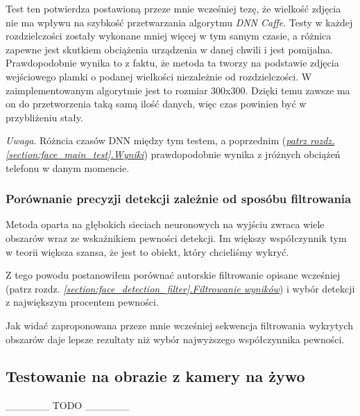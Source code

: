 

Test ten potwierdza postawioną przeze mnie wcześniej tezę, że wielkość zdjęcia nie ma wpływu na szybkość przetwarzania algorytmu \textit{DNN Caffe}. Testy w każdej rozdzielczości zostały wykonane mniej więcej w tym samym czasie, a różnica zapewne jest skutkiem obciążenia urządzenia w danej chwili i jest pomijalna.\\
Prawdopodobnie wynika to z faktu, że metoda ta tworzy na podstawie zdjęcia wejściowego plamki o podanej wielkości niezależnie od rozdzielczości. W zaimplementowanym algorytmie jest to rozmiar 300x300. Dzięki temu zawsze ma on do przetworzenia taką samą ilość danych, więc czas powinien być w przybliżeniu stały.

\textit{Uwaga}. Różncia czasów DNN między tym testem, a poprzednim (\hyperref[{section:face_main_test}]{\textit{patrz rozdz. \ref{section:face_main_test}.Wyniki}}) prawdopodobnie wynika z jróżnych obciążeń telefonu w danym momencie.

\subsubsection{Porównanie precyzji detekcji zależnie od sposóbu filtrowania}

Metoda oparta na głębokich sieciach neuronowych na wyjściu zwraca wiele obszarów wraz ze wskaźnikiem pewności detekcji. Im większy współczynnik tym w teorii większa szansa, że jest to obiekt, który chcieliśmy wykryć.
\par
Z tego powodu postanowiłem porównać autorskie filtrowanie opisane wcześniej (patrz rozdz. \hyperref[{section:face_detection_filter}]{\textit{\ref{section:face_detection_filter}.Filtrowanie wyników}}) i wybór detekcji z największym procentem pewności.
\par




Jak widać zaproponowana przeze mnie wcześniej sekwencja filtrowania wykrytych obszarów daje lepsze rezultaty niż wybór najwyższego współczynnika pewności.


\subsection{Testowanie na obrazie z kamery na żywo}

\_\_\_\_\_\_ TODO \_\_\_\_\_\_ 